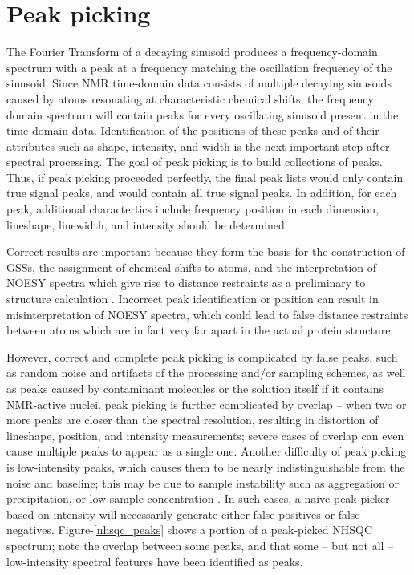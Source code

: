 \section{Peak picking}

The Fourier Transform of a decaying sinusoid produces a frequency-domain 
spectrum with a peak at a frequency matching the oscillation frequency of 
the sinusoid.  Since NMR time-domain data consists of multiple decaying 
sinusoids caused by atoms resonating at characteristic chemical shifts, 
the frequency domain spectrum will contain peaks for every oscillating 
sinusoid present in the time-domain data.  Identification of the positions 
of these peaks and of their attributes such as shape, intensity, and width 
is the next important step after spectral processing.  The goal of peak 
picking is to build collections of peaks.  Thus, if peak picking proceeded 
perfectly, the final peak lists would only contain true signal peaks, and 
would contain all true signal peaks.  
In addition, for each peak, additional charactertics include frequency 
position in each dimension, lineshape, linewidth, and intensity should be 
determined.

Correct results are important because they form the basis for the construction 
of GSSs, the assignment of chemical shifts to atoms, and the interpretation of 
NOESY spectra which give rise to distance restraints as a preliminary to 
structure calculation \cite{guerry2011automated}.  
Incorrect peak identification or position can result 
in misinterpretation of NOESY spectra, which could lead to false distance 
restraints between atoms which are in fact very far apart in the actual 
protein structure.
	
However, correct and complete peak picking is complicated by false peaks, 
such as random noise and artifacts of the processing and/or sampling schemes, 
as well as peaks caused by contaminant molecules or the solution itself if it 
contains NMR-active nuclei.  peak picking is further complicated by overlap -- 
when two or more peaks are closer than the spectral resolution, resulting in 
distortion of lineshape, position, and intensity measurements; severe cases 
of overlap can even cause multiple peaks to appear as a single one.  Another 
difficulty of peak picking is low-intensity peaks, which causes them to be 
nearly indistinguishable from the noise and baseline; this may be due to 
sample instability such as aggregation or precipitation, or low sample 
concentration
\cite{picky, munin, korzhnev2001munin, apart,
autopsy, pine}
\cite{williamson2009automated, guntert2009automated, altieri2004automation,
baran2004automated}.
In such cases, a naive peak picker based on intensity will necessarily 
generate either false positives or false negatives.
Figure-\ref{nhsqc_peaks} shows a portion of a peak-picked
NHSQC spectrum; note the overlap between some peaks, and that some -- but not
all -- low-intensity spectral features have been identified as peaks.

